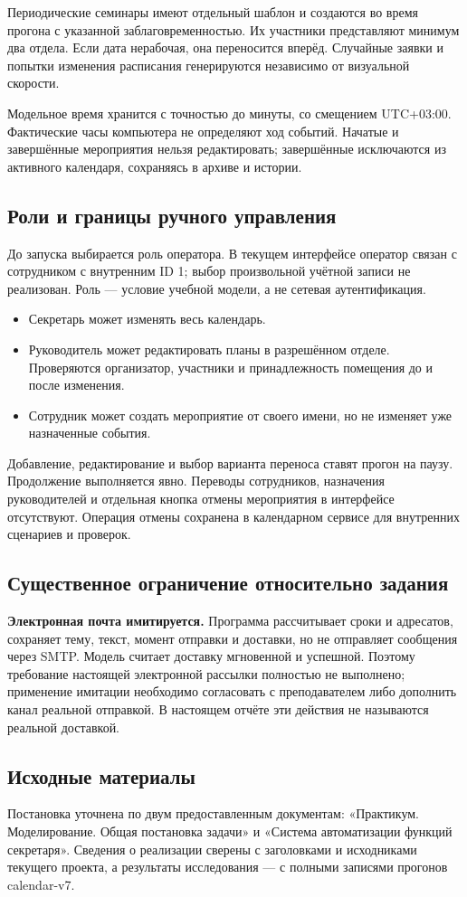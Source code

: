 Периодические семинары имеют отдельный шаблон и создаются во время прогона с указанной заблаговременностью. Их участники представляют минимум два отдела. Если дата нерабочая, она переносится вперёд. Случайные заявки и попытки изменения расписания генерируются независимо от визуальной скорости.

Модельное время хранится с точностью до минуты, со смещением UTC+03:00. Фактические часы компьютера не определяют ход событий. Начатые и завершённые мероприятия нельзя редактировать; завершённые исключаются из активного календаря, сохраняясь в архиве и истории.

\subsection{Роли и границы ручного управления}
До запуска выбирается роль оператора. В текущем интерфейсе оператор связан с сотрудником с внутренним ID 1; выбор произвольной учётной записи не реализован. Роль --- условие учебной модели, а не сетевая аутентификация.
\begin{itemize}
\item Секретарь может изменять весь календарь.
\item Руководитель может редактировать планы в разрешённом отделе. Проверяются организатор, участники и принадлежность помещения до и после изменения.
\item Сотрудник может создать мероприятие от своего имени, но не изменяет уже назначенные события.
\end{itemize}
Добавление, редактирование и выбор варианта переноса ставят прогон на паузу. Продолжение выполняется явно. Переводы сотрудников, назначения руководителей и отдельная кнопка отмены мероприятия в интерфейсе отсутствуют. Операция отмены сохранена в календарном сервисе для внутренних сценариев и проверок.

\subsection{Существенное ограничение относительно задания}
\textbf{Электронная почта имитируется.} Программа рассчитывает сроки и адресатов, сохраняет тему, текст, момент отправки и доставки, но не отправляет сообщения через SMTP. Модель считает доставку мгновенной и успешной. Поэтому требование настоящей электронной рассылки полностью не выполнено; применение имитации необходимо согласовать с преподавателем либо дополнить канал реальной отправкой. В настоящем отчёте эти действия не называются реальной доставкой.

\subsection{Исходные материалы}
Постановка уточнена по двум предоставленным документам: «Практикум. Моделирование.
Общая постановка задачи» и «Система автоматизации функций секретаря».
Сведения о реализации сверены с заголовками и исходниками текущего проекта,
а результаты исследования --- с полными записями прогонов calendar-v7.

